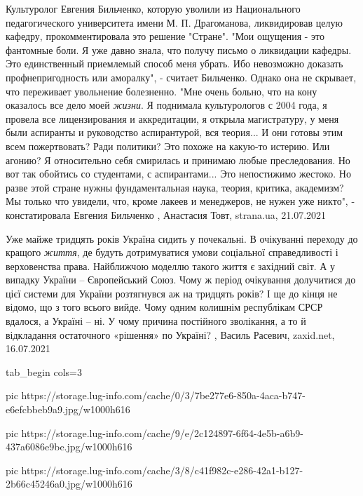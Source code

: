 Культуролог Евгения Бильченко, которую уволили из Национального педагогического
университета имени М. П. Драгоманова, ликвидировав целую кафедру,
прокомментировала это решение "Стране".  "Мои ощущения - это фантомные боли. Я
уже давно знала, что получу письмо о ликвидации кафедры. Это единственный
приемлемый способ меня убрать. Ибо невозможно доказать профнепригодность или
аморалку", - считает Бильченко.  Однако она не скрывает, что переживает
увольнение болезненно.  "Мне очень больно, что на кону оказалось все дело моей
\emph{жизни}. Я поднимала культурологов с 2004 года, я провела все
лицензирования и аккредитации, я открыла магистратуру, у меня были аспиранты и
руководство аспирантурой, вся теория... И они готовы этим всем пожертвовать?
Ради политики? Это похоже на какую-то истерию. Или агонию? Я относительно себя
смирилась и принимаю любые преследования. Но вот так обойтись со студентами, с
аспирантами... Это непостижимо жестоко. Но разве этой стране нужны
фундаментальная наука, теория, критика, академизм? Мы только что увидели, что,
кроме лакеев и менеджеров, не нужен уже никто", - констатировала Евгения
Бильченко
, 
Анастасия Товт, strana.ua, 21.07.2021


Уже майже тридцять років Україна сидить у почекальні. В очікуванні переходу до
кращого \emph{життя}, де будуть дотримуватися умови соціальної справедливості і
верховенства права. Найближчою моделлю такого життя є західний світ. А у
випадку України – Європейський Союз. Чому ж період очікування долучитися до
цієї системи для України розтягнувся аж на тридцять років? І ще до кінця не
відомо, що з того всього вийде. Чому одним колишнім республікам СРСР вдалося, а
Україні – ні. У чому причина постійного зволікання, а то й відкладання
остаточного «рішення» по Україні?
, 
Василь Расевич, zaxid.net, 16.07.2021

\ifcmt
  tab_begin cols=3

     pic https://storage.lug-info.com/cache/0/3/7be277e6-850a-4aca-b747-e6efcbbeb9a9.jpg/w1000h616%

     pic https://storage.lug-info.com/cache/9/e/2c124897-6f64-4e5b-a6b9-437a6086e9be.jpg/w1000h616%

		 pic https://storage.lug-info.com/cache/3/8/c41f982c-e286-42a1-b127-2b66c45246a0.jpg/w1000h616%

